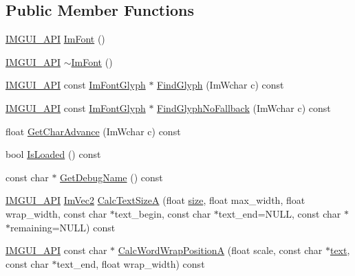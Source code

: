 \subsection*{Public Member Functions}
\begin{DoxyCompactItemize}
\item 
\hyperlink{imgui_8h_a43829975e84e45d1149597467a14bbf5}{I\+M\+G\+U\+I\+\_\+\+A\+PI} \hyperlink{structImFont_a1d35b1eb7c2f6a3a648308531e88e7f1}{Im\+Font} ()
\item 
\hyperlink{imgui_8h_a43829975e84e45d1149597467a14bbf5}{I\+M\+G\+U\+I\+\_\+\+A\+PI} \hyperlink{structImFont_a377366ed7c5d076363ad4760aeff63ec}{$\sim$\+Im\+Font} ()
\item 
\hyperlink{imgui_8h_a43829975e84e45d1149597467a14bbf5}{I\+M\+G\+U\+I\+\_\+\+A\+PI} const \hyperlink{structImFontGlyph}{Im\+Font\+Glyph} $\ast$ \hyperlink{structImFont_ac6a773b73c6406fd8f08c4c93213a501}{Find\+Glyph} (Im\+Wchar c) const
\item 
\hyperlink{imgui_8h_a43829975e84e45d1149597467a14bbf5}{I\+M\+G\+U\+I\+\_\+\+A\+PI} const \hyperlink{structImFontGlyph}{Im\+Font\+Glyph} $\ast$ \hyperlink{structImFont_aa9ce4765070dfdee66bf5e5e81acaac3}{Find\+Glyph\+No\+Fallback} (Im\+Wchar c) const
\item 
float \hyperlink{structImFont_adffcff4e4e2d17455410bd4ba76b42e4}{Get\+Char\+Advance} (Im\+Wchar c) const
\item 
bool \hyperlink{structImFont_a97dafa61cc94e84be396d69b0d42b1ce}{Is\+Loaded} () const
\item 
const char $\ast$ \hyperlink{structImFont_a11843ed46aaa122264d0da87ffafd627}{Get\+Debug\+Name} () const
\item 
\hyperlink{imgui_8h_a43829975e84e45d1149597467a14bbf5}{I\+M\+G\+U\+I\+\_\+\+A\+PI} \hyperlink{structImVec2}{Im\+Vec2} \hyperlink{structImFont_ad67f64fd206ad197f4b93b1a1ae27cfe}{Calc\+Text\+SizeA} (float \hyperlink{imgui__impl__opengl3__loader_8h_a3d1e3edfcf61ca2d831883e1afbad89e}{size}, float max\+\_\+width, float wrap\+\_\+width, const char $\ast$text\+\_\+begin, const char $\ast$text\+\_\+end=N\+U\+LL, const char $\ast$$\ast$remaining=N\+U\+LL) const
\item 
\hyperlink{imgui_8h_a43829975e84e45d1149597467a14bbf5}{I\+M\+G\+U\+I\+\_\+\+A\+PI} const char $\ast$ \hyperlink{structImFont_a3781bb82a1ceba919cb6c98a398c7a67}{Calc\+Word\+Wrap\+PositionA} (float scale, const char $\ast$\hyperlink{game__play__state_8cpp_a295b62c787445f811e691da4b10f6be4}{text}, const char $\ast$text\+\_\+end, float wrap\+\_\+width) const
\item 
$$
\end{DoxyCompactItemize}
